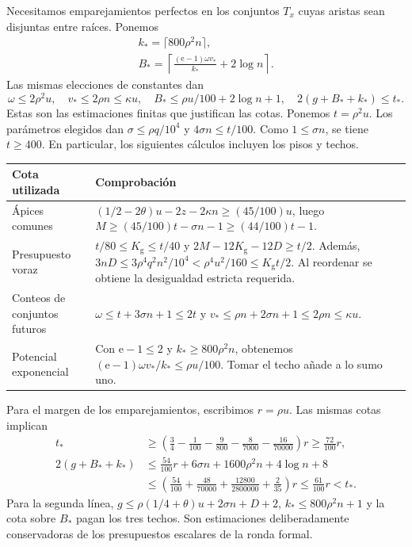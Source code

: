 \documentclass[spanish,11pt,a4paper]{article}
\begin{document}
Necesitamos emparejamientos perfectos en los conjuntos \(T_x\) cuyas aristas sean disjuntas entre raíces. Ponemos \[\begin{gathered}
k_*=\lceil800\rho^2n\rceil,\\
B_*=\left\lceil\frac{(\mathrm e-1)\omega v_*}{k_*}+2\log n\right\rceil.
\end{gathered}\] Las mismas elecciones de constantes dan \[\omega\le2\rho^2u,\quad v_*\le2\rho n\le\kappa u,\quad
B_*\le\rho u/100+2\log n+1,\quad
2(g+B_*+k_*)\le t_*.\] Estas son las estimaciones finitas que justifican las cotas. Ponemos \(t=\rho^2u\). Los parámetros elegidos dan \(\sigma\le\rho q/10^4\) y \(4\sigma n\le t/100\). Como \(1\le\sigma n\), se tiene \(t\ge400\). En particular, los siguientes cálculos incluyen los pisos y techos.

{\begin{longtable}[]{@{}
  >{\raggedright\arraybackslash}p{}
  >{\raggedright\arraybackslash}p{}@{}}
\toprule\noalign{}
\begin{minipage}[b]{\linewidth}\raggedright
Cota utilizada
\end{minipage} & \begin{minipage}[b]{\linewidth}\raggedright
Comprobación
\end{minipage} \\
\midrule\noalign{}
\endhead
\bottomrule\noalign{}
\endlastfoot
Ápices comunes & \((1/2-2\theta)u-2z-2\kappa n\ge(45/100)u\), luego \(M\ge(45/100)t-\sigma n-1\ge(44/100)t-1\). \\
Presupuesto voraz & \(t/80\le K_{\mathrm g}\le t/40\) y \(2M-12K_{\mathrm g}-12D\ge t/2\). Además, \(3nD\le3\rho^4q^2n^2/10^4<\rho^4u^2/160\le K_{\mathrm g}t/2\). Al reordenar se obtiene la desigualdad estricta requerida. \\
Conteos de conjuntos futuros & \(\omega\le t+3\sigma n+1\le2t\) y \(v_*\le\rho n+2\sigma n+1\le2\rho n\le\kappa u\). \\
Potencial exponencial & Con \(\mathrm e-1\le2\) y \(k_*\ge800\rho^2n\), obtenemos \((\mathrm e-1)\omega v_*/k_*\le\rho u/100\). Tomar el techo añade a lo sumo uno. \\
\end{longtable}
}

Para el margen de los emparejamientos, escribimos \(r=\rho u\). Las mismas cotas implican \[\begin{aligned}
t_*&\ge\left(\frac34-\frac1{100}-\frac9{800}-\frac8{7000}-\frac{16}{70000}\right)r
\ge\frac{72}{100}r,\\
2(g+B_*+k_*)&\le\frac{54}{100}r+6\sigma n+1600\rho^2n+4\log n+8\\
&\le\left(\frac{54}{100}+\frac{48}{70000}+\frac{12800}{2800000}+\frac2{35}\right)r
\le\frac{61}{100}r<t_*.
\end{aligned}\] Para la segunda línea, \(g\le\rho(1/4+\theta)u+2\sigma n+D+2\), \(k_*\le800\rho^2n+1\) y la cota sobre \(B_*\) pagan los tres techos. Son estimaciones deliberadamente conservadoras de los presupuestos escalares de la ronda formal.
\end{document}
